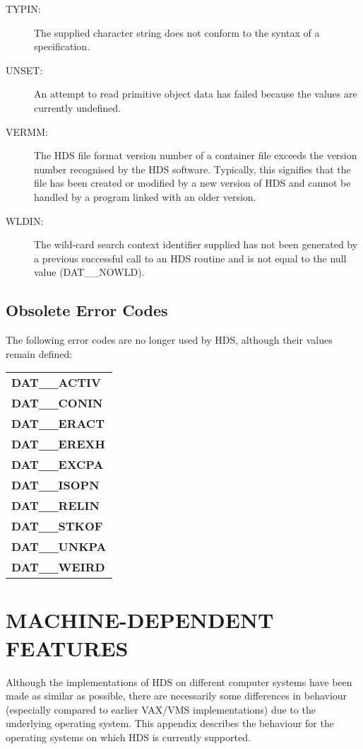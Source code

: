 \documentclass[twoside,11pt]{starlink}
\begin{document}
\begin{description}
\item [TYPIN:]
The supplied character string does not conform to the syntax of a
 specification.

\item [UNSET:]
An attempt to read primitive object data has failed because the values are
currently undefined.

\item [VERMM:]
The HDS file format version number of a container file exceeds the version
number recognised by the HDS software. Typically, this signifies that the file
has been created or modified by a new version of HDS and cannot be handled by a
program linked with an older version.

\item [WLDIN:]
The wild-card search context identifier supplied has not been generated by a
previous successful call to an HDS routine and is not equal to the null value
(DAT\_\_NOWLD).

\end{description}

\subsection{Obsolete Error Codes}
The following error codes are no longer used by HDS, although their values
remain defined:

\begin{center}
\begin{tabular}{l}
\textbf{DAT\_\_ACTIV}\\
\textbf{DAT\_\_CONIN}\\
\textbf{DAT\_\_ERACT}\\
\textbf{DAT\_\_EREXH}\\
\textbf{DAT\_\_EXCPA}\\
\textbf{DAT\_\_ISOPN}\\
\textbf{DAT\_\_RELIN}\\
\textbf{DAT\_\_STKOF}\\
\textbf{DAT\_\_UNKPA}\\
\textbf{DAT\_\_WEIRD}
\end{tabular}
\end{center}

\newpage
\section{MACHINE-DEPENDENT FEATURES}

Although the implementations of HDS on different computer systems have
been made as similar as possible, there are necessarily some
differences in behaviour (especially compared to earlier VAX/VMS
implementations) due to the underlying operating system. This appendix
describes the behaviour for the operating systems on which HDS is
currently supported.
\end{document}
